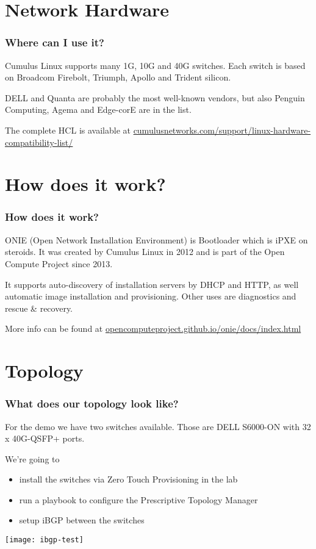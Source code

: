 \documentclass[10pt, compress]{beamer}
\begin{document}
\section{Network Hardware}

\begin{frame}[fragile]
  \frametitle{Where can I use it?}
  
Cumulus Linux supports many 1G, 10G and 40G switches.
Each switch is based on Broadcom Firebolt, Triumph, Apollo and Trident silicon.

DELL and Quanta are probably the most well-known vendors, but also Penguin Computing,
Agema and Edge-corE are in the list.

The complete HCL is available at
\url{cumulusnetworks.com/support/linux-hardware-compatibility-list/}
\end{frame}

\section{How does it work?}

\begin{frame}[fragile]
  \frametitle{How does it work?}

ONIE (Open Network Installation Environment) is Bootloader which is iPXE on steroids.
It was created by Cumulus Linux in 2012 and is part of the Open Compute Project since 2013.

It supports auto-discovery of installation servers by DHCP and HTTP, as well automatic image installation
and provisioning.
Other uses are diagnostics and rescue \& recovery.

More info can be found at \url{opencomputeproject.github.io/onie/docs/index.html}
\end{frame}

\section{Topology}

\begin{frame}[fragile]
  \frametitle{What does our topology look like?}

For the demo we have two switches available. Those are DELL S6000-ON with 32 x 40G-QSFP+ ports.

We're going to

      \begin{itemize}
        \item install the switches via Zero Touch Provisioning in the lab
        \item run a playbook to configure the Prescriptive Topology Manager
        \item setup iBGP between the switches
       \end{itemize}

\begin{center}
  \texttt{[image: ibgp-test]}
\end{center}

\end{frame}
\end{document}
